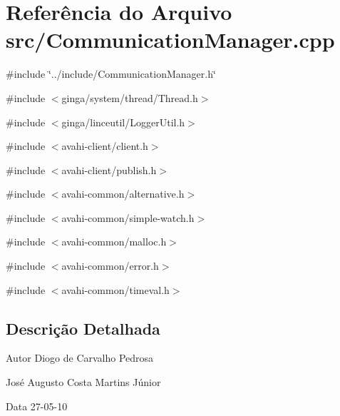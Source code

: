 \section{Referência do Arquivo src/CommunicationManager.cpp}
\label{CommunicationManager_8cpp}
{\ttfamily \#include \char`\"{}../include/CommunicationManager.h\char`\"{}}\par
{\ttfamily \#include $<$ginga/system/thread/Thread.h$>$}\par
{\ttfamily \#include $<$ginga/linceutil/LoggerUtil.h$>$}\par
{\ttfamily \#include $<$avahi-\/client/client.h$>$}\par
{\ttfamily \#include $<$avahi-\/client/publish.h$>$}\par
{\ttfamily \#include $<$avahi-\/common/alternative.h$>$}\par
{\ttfamily \#include $<$avahi-\/common/simple-\/watch.h$>$}\par
{\ttfamily \#include $<$avahi-\/common/malloc.h$>$}\par
{\ttfamily \#include $<$avahi-\/common/error.h$>$}\par
{\ttfamily \#include $<$avahi-\/common/timeval.h$>$}\par


\subsection{Descrição Detalhada}
\begin{DoxyAuthor}{Autor}
Diogo de Carvalho Pedrosa 

José Augusto Costa Martins Júnior 
\end{DoxyAuthor}
\begin{DoxyDate}{Data}
27-\/05-\/10 
\end{DoxyDate}
